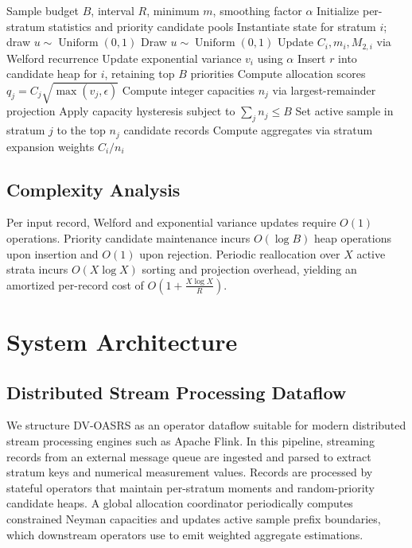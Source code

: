 \documentclass[conference]{IEEEtran}
\begin{document}
\begin{algorithm}[htbp]
\caption{DV-OASRS Update and Dynamic Allocation}
\label{alg:dvoasrs}
\begin{algorithmic}[1]
\Require Sample budget $B$, interval $R$, minimum $m$, smoothing factor $\alpha$
\State Initialize per-stratum statistics and priority candidate pools
    \State Instantiate state for stratum $i$; draw $u \sim \operatorname{Uniform}(0,1)$
  \Else
    \State Draw $u \sim \operatorname{Uniform}(0,1)$
  \EndIf
  \State Update $C_i, m_i, M_{2,i}$ via Welford recurrence
  \State Update exponential variance $v_i$ using $\alpha$
  \State Insert $r$ into candidate heap for $i$, retaining top $B$ priorities
    \State Compute allocation scores $q_j = C_j \sqrt{\max(v_j, \epsilon)}$
    \State Compute integer capacities $n_j$ via largest-remainder projection
    \State Apply capacity hysteresis subject to $\sum_j n_j \le B$
    \State Set active sample in stratum $j$ to the top $n_j$ candidate records
  \EndIf
\EndFor
\State Compute aggregates via stratum expansion weights $C_i / n_i$
\end{algorithmic}
\end{algorithm}

\subsection{Complexity Analysis}

Per input record, Welford and exponential variance updates require $O(1)$ operations. Priority candidate maintenance incurs $O(\log B)$ heap operations upon insertion and $O(1)$ upon rejection. Periodic reallocation over $X$ active strata incurs $O(X \log X)$ sorting and projection overhead, yielding an amortized per-record cost of $O(1 + \frac{X \log X}{R})$.


\section{System Architecture}
\label{sec:architecture}

\subsection{Distributed Stream Processing Dataflow}

We structure DV-OASRS as an operator dataflow suitable for modern distributed stream processing engines such as Apache Flink. In this pipeline, streaming records from an external message queue are ingested and parsed to extract stratum keys and numerical measurement values. Records are processed by stateful operators that maintain per-stratum moments and random-priority candidate heaps. A global allocation coordinator periodically computes constrained Neyman capacities and updates active sample prefix boundaries, which downstream operators use to emit weighted aggregate estimations.
\end{document}
